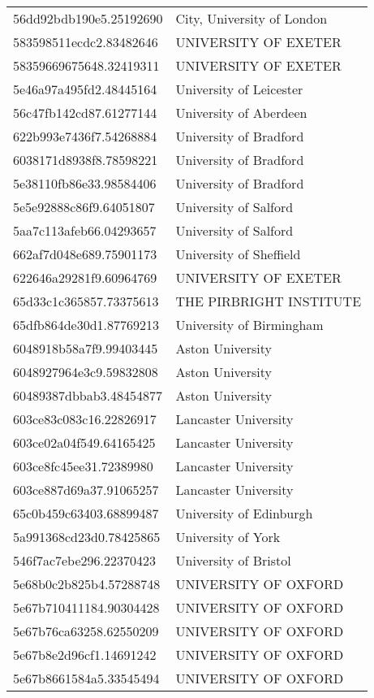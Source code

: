 \begin{tabular}{ll}
56dd92bdb190e5.25192690 & City, University of London \\
583598511ecdc2.83482646 & UNIVERSITY OF EXETER \\
58359669675648.32419311 & UNIVERSITY OF EXETER \\
5e46a97a495fd2.48445164 & University of Leicester \\
56c47fb142cd87.61277144 & University of Aberdeen \\
622b993e7436f7.54268884 & University of Bradford \\
6038171d8938f8.78598221 & University of Bradford \\
5e38110fb86e33.98584406 & University of Bradford \\
5e5e92888c86f9.64051807 & University of Salford \\
5aa7c113afeb66.04293657 & University of Salford \\
662af7d048e689.75901173 & University of Sheffield \\
622646a29281f9.60964769 & UNIVERSITY OF EXETER \\
65d33c1c365857.73375613 & THE PIRBRIGHT INSTITUTE \\
65dfb864de30d1.87769213 & University of Birmingham \\
6048918b58a7f9.99403445 & Aston University \\
6048927964e3c9.59832808 & Aston University \\
60489387dbbab3.48454877 & Aston University \\
603ce83c083c16.22826917 & Lancaster University \\
603ce02a04f549.64165425 & Lancaster University \\
603ce8fc45ee31.72389980 & Lancaster University \\
603ce887d69a37.91065257 & Lancaster University \\
65c0b459c63403.68899487 & University of Edinburgh \\
5a991368cd23d0.78425865 & University of York \\
546f7ac7ebe296.22370423 & University of Bristol \\
5e68b0c2b825b4.57288748 & UNIVERSITY OF OXFORD \\
5e67b710411184.90304428 & UNIVERSITY OF OXFORD \\
5e67b76ca63258.62550209 & UNIVERSITY OF OXFORD \\
5e67b8e2d96cf1.14691242 & UNIVERSITY OF OXFORD \\
5e67b8661584a5.33545494 & UNIVERSITY OF OXFORD \\

\end{tabular}
